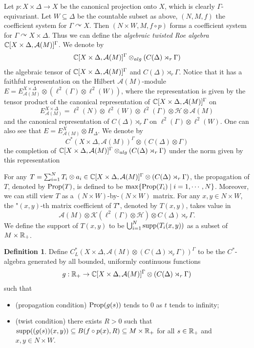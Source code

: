 \documentclass[11pt]{article}
\theoremstyle{definition}
\newtheorem{Def}{Definition}[section]
\theoremstyle{plain}
\def\A{\mathcal A}\def\C{\mathcal C}\def\B{\mathcal B}\def\E{\mathcal E}\def\O{\mathcal O}\def\h{\mathfrak h}\def\K{\mathcal K}\def\F{\mathcal F}\def\P{\mathcal P}\def\L{\mathcal L}\def\R{\mathcal R}\def\Q{\mathcal Q}\def\H{\mathcal H}\def\S{\mathcal S}\def\N{\mathcal N}\def\U{\mathcal U}\def\V{\mathcal V}
\def\supp{\textup{supp}}
\def\prop{\textup{Prop}}
\def\ox{\otimes}
\def\ox{\otimes}
\def\Ga{\Gamma}
\def\car{\curvearrowright}
\begin{document}
Let $p: X\times\Delta\to X$ be the canonical projection onto $X$, which is clearly $\Ga$-equivariant. Let $W\subseteq \Delta$ be the countable subset as above, $(N,M,f)$ the coefficient system for $\Ga\car X$. Then $(N\times W,M,f\circ p)$ forms a coefficient system for $\Ga\car X\times\Delta$. Thus we can define the \emph{algebraic twisted Roe algebra} $\IC[X\times\Delta,\A(M)]^{\Ga}$. We denote by
$$\IC[X\times\Delta,\A(M)]^{\Ga}\ox_{alg}(C(\Delta)\rtimes_r\Ga)$$
the algebraic tensor of $\IC[X\times\Delta,\A(M)]^{\Ga}$ and $C(\Delta)\rtimes_r\Ga$. Notice that it has a faithful representation on the Hilbert $\A(M)$-module $E=E^{X\times\Delta}_{\A(M)}\ox (\ell^2(\Ga)\ox\ell^2(W))$, where the representation is given by the tensor product of the canonical representation of $\IC[X\times\Delta,\A(M)]^{\Ga}$ on
$$E^{X\times\Delta}_{\A(M)}=\ell^2(N)\ox\ell^2(W)\ox\ell^2(\Ga)\ox\H\ox\A(M)$$
and the canonical representation of $C(\Delta)\rtimes_r\Ga$ on $\ell^2(\Ga)\ox\ell^2(W)$. One can also see that $E= E^X_{\A(M)}\ox H_\Delta$.
We denote by 
$$C^*(X\times\Delta,\A(M))^{\Ga}\ox (C(\Delta)\ox\Ga)$$
the completion of $\IC[X\times\Delta,\A(M)]^{\Ga}\ox_{alg}(C(\Delta)\rtimes_r\Ga)$ under the norm given by this representation

For any $T=\sum_{i=1}^N T_i\ox a_i\in\IC[X\times\Delta,\A(M)]^{\Ga}\ox (C(\Delta)\rtimes_r\Ga)$, the propagation of $T$, denoted by $\prop(T)$, is defined to be $\max\{\prop(T_i)\mid i=1,\cdots,N\}$. Moreover, we can still view $T$ as a $(N\times W)$-by-$(N\times W)$ matrix. For any $x,y\in N\times W$, the "$(x,y)$-th matrix coefficient of $T$", denoted by $T(x,y)$, takes value in 
$$\A(M)\ox\K(\ell^2(\Ga)\ox\H)\ox C(\Delta)\rtimes_r\Ga.$$
We define the support of $T(x,y)$ to be $\bigcup_{i=1}^N\supp(T_i(x,y))$ as a subset of $M\times \mathbb R_+$.

\begin{Def}
Define $C^*_L(X\times\Delta,\A(M)\ox(C(\Delta)\rtimes_r\Ga))^{\Ga}$ to be the $C^*$-algebra generated by all bounded, uniformly continuous functions
$$g:\IR_+\to\IC[X\times\Delta,\A(M)]^{\Ga}\ox(C(\Delta)\rtimes_r\Ga)$$
such that\begin{itemize}
\item[(1)] (propagation condition) $\prop(g(s))$ tends to $0$ as $t$ tends to infinity;
\item[(2)] (twist condition) there exists $R> 0$ such that $\supp((g(s))(x,y))\subseteq B(f\circ p(x),R)\subseteq M\times\IR_+$ for all $s\in\mathbb R_+$ and $x,y\in N\times W$.
\end{itemize}\end{Def}
\end{document}
